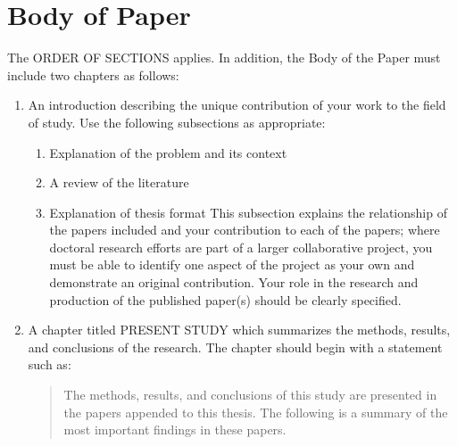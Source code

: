 \documentclass[draft]{ua-thesis}
\begin{document}
\section{Body of Paper}
 The ORDER OF SECTIONS applies. In addition, the Body of the
Paper must include two chapters as follows:
\begin{enumerate}
  \item An introduction describing the unique contribution of your work to the
     field of study. Use the following subsections as appropriate:
       \begin{enumerate}
       \item Explanation of the problem and its context
       \item A review of the literature
       \item Explanation of thesis format
          This subsection explains the relationship of the papers included
          and your contribution to each of the papers; where doctoral
          research efforts are part of a larger collaborative project, you
          must be able to identify one aspect of the project as your own and
          demonstrate an original contribution. Your role in the research
          and production of the published paper(s) should be clearly
          specified.
       \end{enumerate}
  \item A chapter titled PRESENT STUDY which summarizes the methods, results,
     and conclusions of the research. The chapter should begin with a
     statement such as:
\begin{quote}
          The methods, results, and conclusions of this study are
          presented in the papers appended to this thesis. The
          following is a summary of the most important findings in
          these papers.
\end{quote}
\end{enumerate}
\end{document}
